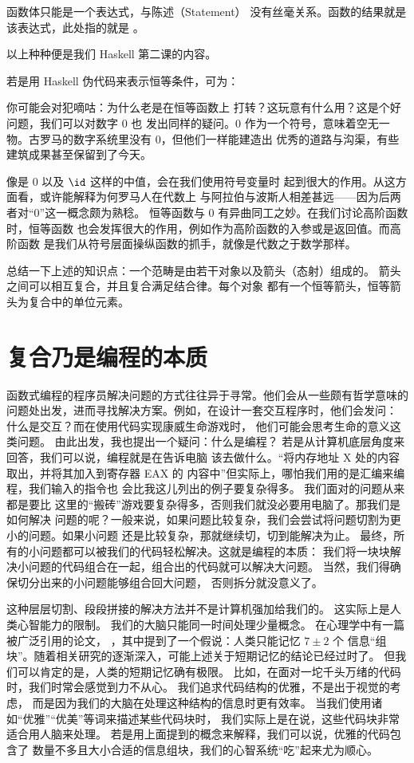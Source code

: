 函数体只能是一个表达式，与陈述（Statement）
没有丝毫关系。函数的结果就是该表达式，此处指的就是 
。

以上种种便是我们 Haskell 第二课的内容。

若是用 Haskell 伪代码来表示恒等条件，可为：

你可能会对犯嘀咕：为什么老是在恒等函数上
打转？这玩意有什么用？这是个好问题，我们可以对数字 0 也
发出同样的疑问。0 作为一个符号，意味着空无一物。古罗马的数字系统里没有 0，但他们一样能建造出
优秀的道路与沟渠，有些建筑成果甚至保留到了今天。


像是 0 以及 $\id$ 这样的中值，会在我们使用符号变量时
起到很大的作用。从这方面看，或许能解释为何罗马人在代数上
与阿拉伯与波斯人相差甚远——因为后两者对“0”这一概念颇为熟稔。
恒等函数与 0 有异曲同工之妙。在我们讨论高阶函数时，恒等函数
也会发挥很大的作用，例如作为高阶函数的入参或是返回值。而高阶函数
是我们从符号层面操纵函数的抓手，就像是代数之于数学那样。


总结一下上述的知识点：一个范畴是由若干对象以及箭头（态射）组成的。
箭头之间可以相互复合，并且复合满足结合律。每个对象
都有一个恒等箭头，恒等箭头为复合中的单位元素。

\section{复合乃是编程的本质}

函数式编程的程序员解决问题的方式往往异于寻常。他们会从一些颇有哲学意味的
问题处出发，进而寻找解决方案。例如，在设计一套交互程序时，他们会发问：
什么是交互？而在使用代码实现康威生命游戏时，
他们可能会思考生命的意义这类问题。
由此出发，我也提出一个疑问：什么是编程？
若是从计算机底层角度来回答，我们可以说，编程就是在告诉电脑
该去做什么。“将内存地址 X 处的内容取出，并将其加入到寄存器 EAX 的
内容中”但实际上，哪怕我们用的是汇编来编程，我们输入的指令也
会比我这儿列出的例子要复杂得多。
我们面对的问题从来都是要比
这里的“搬砖”游戏要复杂得多，否则我们就没必要用电脑了。那我们是如何解决
问题的呢？一般来说，如果问题比较复杂，我们会尝试将问题切割为更小的问题。如果小问题
还是比较复杂，那就继续切，切到能解决为止。
最终，所有的小问题都可以被我们的代码轻松解决。这就是编程的本质：
我们将一块块解决小问题的代码组合在一起，组合出的代码就可以解决大问题。
当然，我们得确保切分出来的小问题能够组合回大问题，
否则拆分就没意义了。

这种层层切割、段段拼接的解决方法并不是计算机强加给我们的。
这实际上是人类心智能力的限制。
我们的大脑只能同一时间处理少量概念。
在心理学中有一篇被广泛引用的论文，
，其中提到了一个假说：人类只能记忆 $7 \pm 2$ 个
信息“组块”。随着相关研究的逐渐深入，可能上述关于短期记忆的结论已经过时了。
但我们可以肯定的是，人类的短期记忆确有极限。
比如，在面对一坨千头万绪的代码时，我们时常会感觉到力不从心。
我们追求代码结构的优雅，不是出于视觉的考虑，
而是因为我们的大脑在处理这种结构的信息时更有效率。
当我们使用诸如“优雅”“优美”等词来描述某些代码块时，
我们实际上是在说，这些代码块非常适合用人脑来处理。
若是用上面提到的概念来解释，我们可以说，优雅的代码包含了
数量不多且大小合适的信息组块，我们的心智系统“吃”起来尤为顺心。



